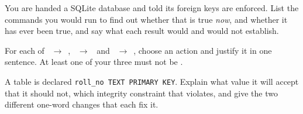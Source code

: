 \begin{checkpoint}
\begin{tightnum}
  \item You are handed a SQLite database and told its foreign keys are
        enforced. List the commands you would run to find out whether that is
        true \emph{now}, and whether it has ever been true, and say what each
        result would and would not establish.
  \item For each of ~$\rightarrow$~,
        ~$\rightarrow$~ and
        ~$\rightarrow$~, choose an
         action and justify it in one sentence. At least one
        of your three must not be .
  \item A table is declared \texttt{roll\_no TEXT PRIMARY KEY}. Explain what
        value it will accept that it should not, which integrity constraint
        that violates, and give the two different one-word changes that each
        fix it.
\end{tightnum}
\end{checkpoint}

